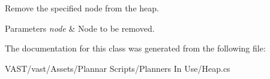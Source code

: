 Remove the specified node from the heap. 


\begin{DoxyParams}{Parameters}
{\em node} & Node to be removed. \\
\hline
\end{DoxyParams}


The documentation for this class was generated from the following file\-:\begin{DoxyCompactItemize}
\item 
V\-A\-S\-T/vast/\-Assets/\-Plannar Scripts/\-Planners In Use/Heap.\-cs\end{DoxyCompactItemize}
